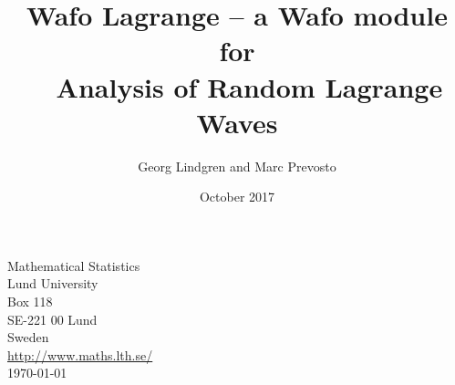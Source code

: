 \documentclass[12pt,openright,twoside,titlepage,a4paper]{LULmanual}
\begin{document}
\ifpdf
{}
\else
{}
\fi

\ifpdf
\graphicspath{%
{./figures/}}
\else
\graphicspath{%
{./figures/}}
\fi

\frontmatter

\title{\noindent \hspace{3mm} {\sc\sf Wafo Lagrange }-- a {\sc\sf Wafo} module for \\
   ~ \hspace*{7mm}Analysis of Random Lagrange Waves}
\author{Georg Lindgren and Marc Prevosto}
\date{October 2017}
\maketitle

{\thispagestyle{empty}
\begin{minipage}{\textwidth}
\end{minipage}
\vfill
\begin{minipage}{\textwidth}

Mathematical Statistics \\
Lund University \\
Box 118\\
SE-221 00 Lund \\
Sweden \\
\url{http://www.maths.lth.se/} \\[3mm]

\noindent
\flushright\today \quad \currenttime

\noindent

\end{minipage}
}
\newpage{}


\clearpage
{}
\tableofcontents

\mainmatter






 

\end{document}
